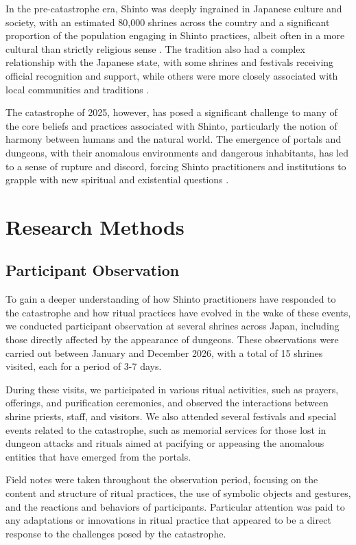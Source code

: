 \documentclass[12pt, a4paper]{article}
\begin{document}
In the pre-catastrophe era, Shinto was deeply ingrained in Japanese culture and society, with an estimated 80,000 shrines across the country and a significant proportion of the population engaging in Shinto practices, albeit often in a more cultural than strictly religious sense \citep{breen2010}. The tradition also had a complex relationship with the Japanese state, with some shrines and festivals receiving official recognition and support, while others were more closely associated with local communities and traditions \citep{hardacre2017}.

The catastrophe of 2025, however, has posed a significant challenge to many of the core beliefs and practices associated with Shinto, particularly the notion of harmony between humans and the natural world. The emergence of portals and dungeons, with their anomalous environments and dangerous inhabitants, has led to a sense of rupture and discord, forcing Shinto practitioners and institutions to grapple with new spiritual and existential questions \citep{sato2026}.

\section{Research Methods}
\subsection{Participant Observation}
To gain a deeper understanding of how Shinto practitioners have responded to the catastrophe and how ritual practices have evolved in the wake of these events, we conducted participant observation at several shrines across Japan, including those directly affected by the appearance of dungeons. These observations were carried out between January and December 2026, with a total of 15 shrines visited, each for a period of 3-7 days.

During these visits, we participated in various ritual activities, such as prayers, offerings, and purification ceremonies, and observed the interactions between shrine priests, staff, and visitors. We also attended several festivals and special events related to the catastrophe, such as memorial services for those lost in dungeon attacks and rituals aimed at pacifying or appeasing the anomalous entities that have emerged from the portals.

Field notes were taken throughout the observation period, focusing on the content and structure of ritual practices, the use of symbolic objects and gestures, and the reactions and behaviors of participants. Particular attention was paid to any adaptations or innovations in ritual practice that appeared to be a direct response to the challenges posed by the catastrophe.
\end{document}
